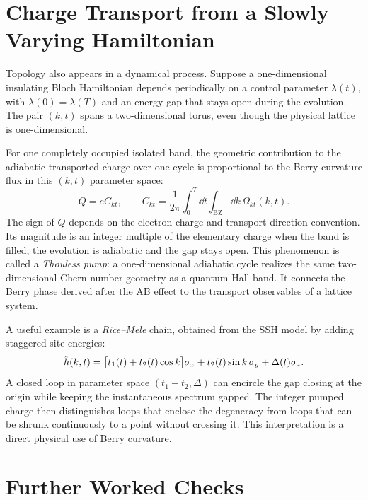 \section{Charge Transport from a Slowly Varying Hamiltonian}
Topology also appears in a dynamical process. Suppose a one-dimensional insulating Bloch Hamiltonian depends periodically on a control parameter $\lambda(t)$, with $\lambda(0)=\lambda(T)$ and an energy gap that stays open during the evolution. The pair $(k,t)$ spans a two-dimensional torus, even though the physical lattice is one-dimensional.

For one completely occupied isolated band, the geometric contribution to the adiabatic transported charge over one cycle is proportional to the Berry-curvature flux in this $(k,t)$ parameter space:
\begin{equation}\label{eq:thouless-pump}
\boxed{Q=eC_{kt},\qquad
 C_{kt}=\frac1{2\pi}\int_0^T\dd t\int_{\mathrm{BZ}}\dd k\,
 \Omega_{kt}(k,t).}
\end{equation}
The sign of $Q$ depends on the electron-charge and transport-direction convention. Its magnitude is an integer multiple of the elementary charge when the band is filled, the evolution is adiabatic and the gap stays open. This phenomenon is called a \emph{Thouless pump}: a one-dimensional adiabatic cycle realizes the same two-dimensional Chern-number geometry as a quantum Hall band. It connects the Berry phase derived after the AB effect to the transport observables of a lattice system.

A useful example is a \emph{Rice--Mele} chain, obtained from the SSH model by adding staggered site energies:
\begin{equation}
 \hat{h}(k,t)=\bigl[t_1(t)+t_2(t)\cos k\bigr]\sigma_x
 +t_2(t)\sin k\,\sigma_y+\Delta(t)\sigma_z.
\end{equation}
A closed loop in parameter space $(t_1-t_2,\Delta)$ can encircle the gap closing at the origin while keeping the instantaneous spectrum gapped. The integer pumped charge then distinguishes loops that enclose the degeneracy from loops that can be shrunk continuously to a point without crossing it. This interpretation is a direct physical use of Berry curvature.



\section{Further Worked Checks}
